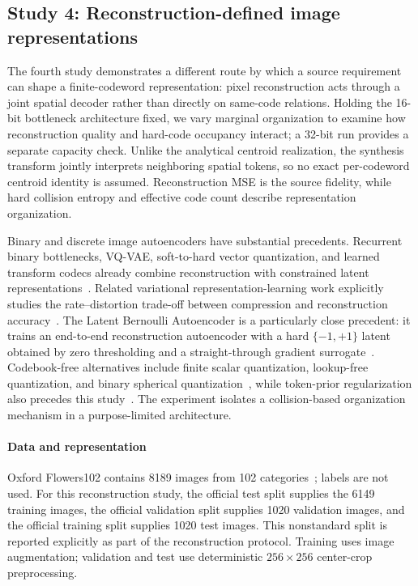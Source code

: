 \subsection{Study 4: Reconstruction-defined image representations}
\label{sec:flowers102-experiment}

The fourth study demonstrates a different route by which a source requirement can shape a finite-codeword representation: pixel reconstruction acts through a joint spatial decoder rather than directly on same-code relations.
Holding the 16-bit bottleneck architecture fixed, we vary marginal organization to examine how reconstruction quality and hard-code occupancy interact; a 32-bit run provides a separate capacity check.
Unlike the analytical centroid realization, the synthesis transform jointly interprets neighboring spatial tokens, so no exact per-codeword centroid identity is assumed.
Reconstruction MSE is the source fidelity, while hard collision entropy and effective code count describe representation organization.

Binary and discrete image autoencoders have substantial precedents.
Recurrent binary bottlenecks, VQ-VAE, soft-to-hard vector quantization, and learned transform codecs already combine reconstruction with constrained latent representations~\citep{toderici2016variable,vanDenOord2017neural,agustsson2017soft,balle2017end,balle2018variational}.
Related variational representation-learning work explicitly studies the rate--distortion trade-off between compression and reconstruction accuracy~\citep{alemi2018fixing}.
The Latent Bernoulli Autoencoder is a particularly close precedent: it trains an end-to-end reconstruction autoencoder with a hard $\{-1,+1\}$ latent obtained by zero thresholding and a straight-through gradient surrogate~\citep{fajtl2020latent}.
Codebook-free alternatives include finite scalar quantization, lookup-free quantization, and binary spherical quantization~\citep{mentzer2024finite,yu2024language,zhao2025binary}, while token-prior regularization also precedes this study~\citep{zhang2023regularized}.
The experiment isolates a collision-based organization mechanism in a purpose-limited architecture.

\paragraph{Data and representation}
Oxford Flowers102 contains 8189 images from 102 categories~\citep{nilsback2008automated}; labels are not used.
For this reconstruction study, the official test split supplies the 6149 training images, the official validation split supplies 1020 validation images, and the official training split supplies 1020 test images.
This nonstandard split is reported explicitly as part of the reconstruction protocol.
Training uses image augmentation; validation and test use deterministic $256\times256$ center-crop preprocessing.

